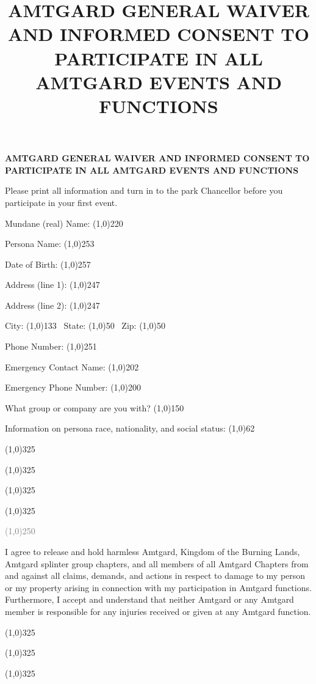 \documentclass[nopagenumbers]{article}
\title{AMTGARD GENERAL WAIVER AND INFORMED CONSENT TO
PARTICIPATE IN ALL AMTGARD EVENTS AND FUNCTIONS}
\author{}
\begin{document}

\begin{center}
\textbf{{\Large AMTGARD GENERAL WAIVER AND INFORMED CONSENT TO
PARTICIPATE IN ALL AMTGARD EVENTS AND FUNCTIONS}}
\end{center}

Please print all information and turn in to the park Chancellor before you participate in your first event.

\bigskip

Mundane (real) Name: \line(1,0){220}

Persona Name: \line(1,0){253}

Date of Birth: \line(1,0){257}


\medskip

Address (line 1): \line(1,0){247}

Address (line 2): \line(1,0){247}

City: \line(1,0){133}~
State: \line(1,0){50}~
Zip: \line(1,0){50}

Phone Number: \line(1,0){251}

\medskip

Emergency Contact Name: \line(1,0){202}

Emergency Phone Number: \line(1,0){200}

\medskip

What group or company are you with? \line(1,0){150}

Information on persona race, nationality, and social status: \line(1,0){62}

\line(1,0){325}

\line(1,0){325}

\line(1,0){325}

\line(1,0){325}

\bigskip

\begin{center}
\textcolor{Gray}{\line(1,0){250}}
\end{center}

I agree to release and hold harmless Amtgard, Kingdom of the Burning Lands, Amtgard splinter group chapters, and all members of all Amtgard Chapters from and against all claims, demands, and actions in respect to damage to my person or my property arising in connection with my participation in Amtgard functions.
Furthermore, I accept and understand that neither Amtgard or any Amtgard member is responsible for any injuries received or given at any Amtgard function.

\bigskip

\line(1,0){325}\\
{\footnotesize {}}

\smallskip

\line(1,0){325}\\
{\footnotesize{}}

\smallskip

\line(1,0){325}\\
{\footnotesize{}}
\end{document}
